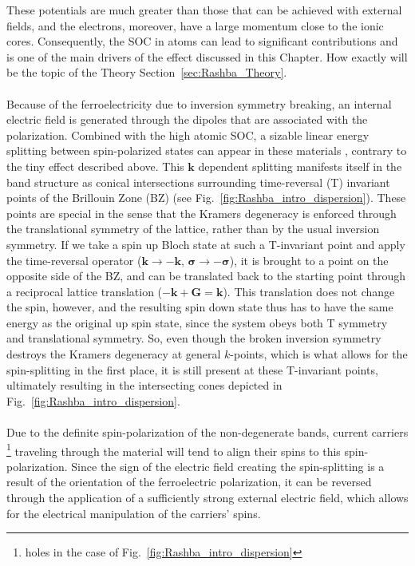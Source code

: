 These potentials are much greater than those that can be achieved with external fields, and the electrons, moreover, have a large momentum close to the ionic cores.
Consequently, the SOC in atoms can lead to significant contributions and is one of the main drivers of the effect discussed in this Chapter.
How exactly will be the topic of the Theory Section~\ref{sec:Rashba_Theory}.
\\\\
Because of the ferroelectricity due to inversion symmetry breaking, an internal electric field is generated through the dipoles that are associated with the polarization.
Combined with the high atomic SOC, a sizable linear energy splitting between spin-polarized states can appear in these materials \cite{DiSante2013}, contrary to the tiny effect described above.
This $\bm k$ dependent splitting manifests itself in the band structure as conical intersections surrounding time-reversal (T) invariant points of the Brillouin Zone (BZ) (see Fig.~\ref{fig:Rashba_intro_dispersion}).
These points are special in the sense that the Kramers degeneracy \cite{Kramerstheorem} is enforced through the translational symmetry of the lattice, rather than by the usual inversion symmetry.
If we take a spin up Bloch state at such a T-invariant point and apply the time-reversal operator ($\bm k \rightarrow \bm {-k}$, $\bm{\sigma} \rightarrow -\bm{\sigma}$), it is brought to a point on the opposite side of the BZ, and can be translated back to the starting point through a reciprocal lattice translation ($-\bm k + \bm G = \bm k$). This translation does not change the spin, however, and the resulting spin down state thus has to have the same energy as the original up spin state, since the system obeys both T symmetry and translational symmetry.
So, even though the broken inversion symmetry destroys the Kramers degeneracy at general $k$-points, which is what allows for the spin-splitting in the first place, it is still present at these T-invariant points, ultimately resulting in the intersecting cones depicted in Fig.~\ref{fig:Rashba_intro_dispersion}.
\\\\
Due to the definite spin-polarization of the non-degenerate bands, current carriers \footnote{holes in the case of Fig.~\ref{fig:Rashba_intro_dispersion}} traveling through the material will tend to align their spins to this spin-polarization.
Since the sign of the electric field creating the spin-splitting is a result of the orientation of the ferroelectric polarization, it can be reversed through the application of a sufficiently strong external electric field, which allows for the electrical manipulation of the carriers' spins.
